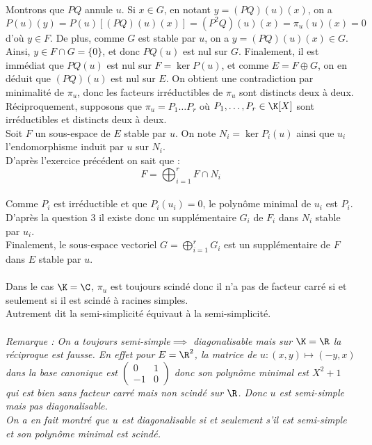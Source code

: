 \documentclass[8pt]{book}
\begin{document}
\begin{enumerate}[leftmargin=*]
		Montrons que $PQ$ annule $u$. Si $x\in G$, en notant $y=(PQ)(u)(x)$, on a
		$$P(u)(y)=P(u)[(PQ)(u)(x)]=(P^2Q)(u)(x)=\pi_u(u)(x)=0$$
		d'où $y\in F$. De plus, comme $G$ est stable par $u$, on a $y=(PQ)(u)(x)\in G$.\\
		Ainsi, $y\in F\cap G=\{0\}$, et donc $PQ(u)$ est nul sur $G$. Finalement, il est immédiat que $PQ(u)$ est nul sur $F=\ker P(u)$, et comme $E=F\oplus G$, on en déduit que $(PQ)(u)$ est nul sur $E$. On obtient une contradiction par minimalité de $\pi_u$, donc les facteurs irréductibles de $\pi_u$ sont distincts deux à deux.\\
		Réciproquement, supposons que $\pi_u=P_1\dots P_r$ où $P_1,\dots,P_r\in \K[X]$ sont irréductibles et distincts deux à deux.\\
		Soit $F$ un sous-espace de $E$ stable par $u$. On note $N_i=\ker P_i(u)$ ainsi que $u_i$ l'endomorphisme induit par $u$ sur $N_i$.\\
		D'après l'exercice précédent on sait que :
		$$F=\displaystyle\bigoplus_{i=1}^rF\cap N_i$$\\
		Comme $P_i$ est irréductible et que $P_i(u_i)=0$, le polynôme minimal de $u_i$ est $P_i$.\\
		D'après la question 3 il existe donc un supplémentaire $G_i$ de $F_i$ dans $N_i$ stable par $u_i$.\\
		Finalement, le sous-espace vectoriel $G=\displaystyle\bigoplus_{i=1}^rG_i$ est un supplémentaire de $F$ dans $E$ stable par $u$.\\\\
		Dans le cas $\K=\C$, $\pi_u$ est toujours scindé donc il n'a pas de facteur carré si et seulement si il est scindé à racines simples.\\
		Autrement dit la semi-simplicité équivaut à la semi-simplicité.\\\\
		\textit{Remarque : On a toujours semi-simple$\implies$ diagonalisable mais sur $\K=\R$ la réciproque est fausse. En effet pour $E=\R^2$, la matrice de $u:(x,y)\mapsto (-y,x)$ dans la base canonique est $\begin{pmatrix}
				0&1\\
				-1&0
			\end{pmatrix}$ donc son polynôme minimal est $X^2+1$ qui est bien sans facteur carré mais non scindé sur $\R$. Donc $u$ est semi-simple mais pas diagonalisable.\\
			On a en fait montré que $u$ est diagonalisable si et seulement s'il est semi-simple et son polynôme minimal est scindé.}
	\end{enumerate}
	
\end{document}
